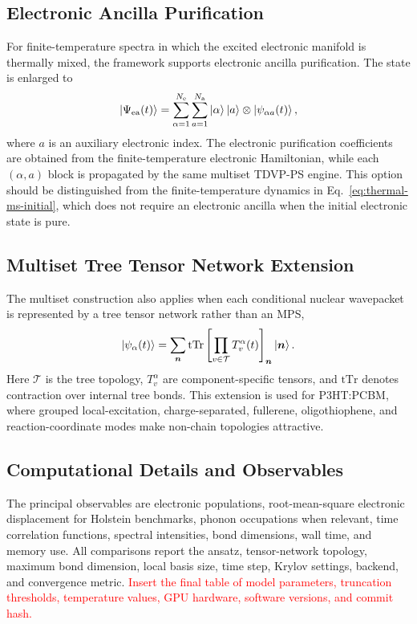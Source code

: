 \documentclass[journal=jctcce,manuscript=article]{achemso}
\newcommand{\placeholder}[1]{\textcolor{red}{#1}}
\begin{document}
\subsection{Electronic Ancilla Purification}

For finite-temperature spectra in which the excited electronic manifold is thermally mixed, the framework supports electronic ancilla purification. The state is enlarged to
\begin{equation}
    \ket{\Psi_{\mathrm{ea}}(t)}=
    \sum_{\alpha=1}^{N_{\mathrm e}}\sum_{a=1}^{N_{\mathrm a}}
    \ket{\alpha}\ket{a}\otimes\ket{\psi_{\alpha a}(t)},
    \label{eq:electronic-ancilla}
\end{equation}
where \(a\) is an auxiliary electronic index. The electronic purification coefficients are obtained from the finite-temperature electronic Hamiltonian, while each \((\alpha,a)\) block is propagated by the same multiset TDVP-PS engine. This option should be distinguished from the finite-temperature dynamics in Eq.~\ref{eq:thermal-ms-initial}, which does not require an electronic ancilla when the initial electronic state is pure.

\subsection{Multiset Tree Tensor Network Extension}

The multiset construction also applies when each conditional nuclear wavepacket is represented by a tree tensor network rather than an MPS,
\begin{equation}
    \ket{\psi_{\alpha}(t)}=\sum_{\bm n}
    \mathrm{tTr}\left[\prod_{v\in\mathcal T}T_v^{\alpha}(t)\right]_{\bm n}\ket{\bm n}.
    \label{eq:multiset-ttns}
\end{equation}
Here \(\mathcal T\) is the tree topology, \(T_v^{\alpha}\) are component-specific tensors, and \(\mathrm{tTr}\) denotes contraction over internal tree bonds. This extension is used for P3HT:PCBM, where grouped local-excitation, charge-separated, fullerene, oligothiophene, and reaction-coordinate modes make non-chain topologies attractive.

\subsection{Computational Details and Observables}

The principal observables are electronic populations, root-mean-square electronic displacement for Holstein benchmarks, phonon occupations when relevant, time correlation functions, spectral intensities, bond dimensions, wall time, and memory use. All comparisons report the ansatz, tensor-network topology, maximum bond dimension, local basis size, time step, Krylov settings, backend, and convergence metric. \placeholder{Insert the final table of model parameters, truncation thresholds, temperature values, GPU hardware, software versions, and commit hash.}
\end{document}
